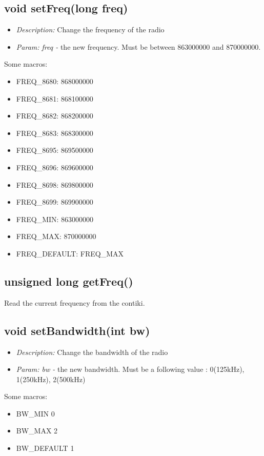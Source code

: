 \documentclass{article}
\begin{document}
\subsection{void setFreq(long freq)}
\begin{itemize}
  \item \emph{Description:} Change the frequency of the radio
  \item \emph{Param: freq -} the new frequency. Must be between 863000000 and 870000000.
\end{itemize}
Some macros:
\begin{itemize}
  \item FREQ\_8680: 868000000
  \item FREQ\_8681: 868100000
  \item FREQ\_8682: 868200000
  \item FREQ\_8683: 868300000
  \item FREQ\_8695: 869500000
  \item FREQ\_8696: 869600000
  \item FREQ\_8698: 869800000
  \item FREQ\_8699: 869900000
  \item FREQ\_MIN: 863000000
  \item FREQ\_MAX: 870000000
  \item FREQ\_DEFAULT: FREQ\_MAX
\end{itemize}

\subsection{unsigned long getFreq()}
Read the current frequency from the contiki.

\subsection{void setBandwidth(int bw)}
\begin{itemize}
  \item \emph{Description:} Change the bandwidth of the radio
  \item \emph{Param: bw -} the new bandwidth. Must be a following value : 0(125kHz), 1(250kHz), 2(500kHz)
\end{itemize}
Some macros:
\begin{itemize}
  \item BW\_MIN     0
  \item BW\_MAX     2
  \item BW\_DEFAULT 1
\end{itemize}
\end{document}
